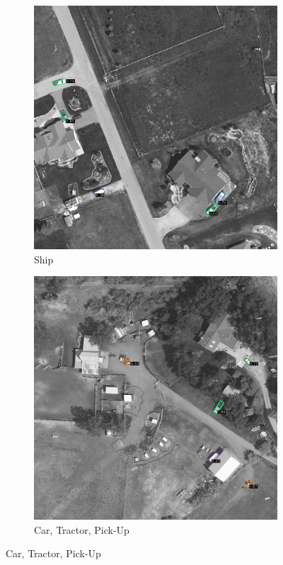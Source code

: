 \begin{figure}[h!]
    \begin{subfigure}[t]{0.38\textwidth}
        \centering
        \includegraphics[width=\linewidth]{images/015Results/03ablation/comp_images/blue/509.png}
        \caption{Ship}
    \end{subfigure}
    \begin{subfigure}[t]{0.38\textwidth}
        \centering
        \includegraphics[width=\linewidth]{images/015Results/03ablation/comp_images/blue/523.png}
        \caption{Car, Tractor, Pick-Up}
    \end{subfigure}
    

\end{figure}
